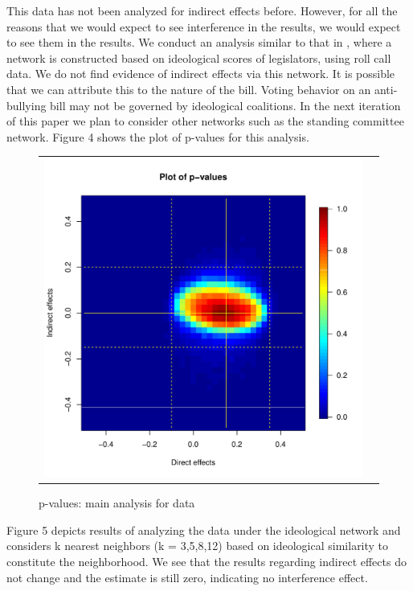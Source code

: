 \documentclass[12pt]{article}
\begin{document}
This data has not been analyzed for indirect effects before. However, for all the reasons that we would expect to see interference in the \citet{butler2011can} results, we would expect to see them in the \citet{bergan2015call} results. We conduct an analysis similar to that in \citet{coppock2014information}, where a network is constructed based on ideological scores of legislators, using roll call data. We do not find evidence of indirect effects via this network. It is possible that we can attribute this to the nature of the bill. Voting behavior on an anti-bullying bill may not be governed by ideological coalitions. In the next iteration of this paper we plan to consider other networks such as the standing committee network.  Figure 4 shows the plot of p-values for this analysis.

\begin{figure}
	\centering
	\begin{tabular}{cc}
	\includegraphics[scale=0.45]{./images/pval_plot_bergan_main.pdf}
	\end{tabular}
	\caption{p-values: main analysis for \citet{bergan2015call} data}
\end{figure}


Figure 5 depicts results of analyzing the \citet{bergan2015call} data under the ideological network and considers k nearest neighbors (k = 3,5,8,12) based on ideological similarity to constitute the neighborhood. We see that the results regarding indirect effects do not change and the estimate is still zero, indicating no interference effect.
\end{document}
